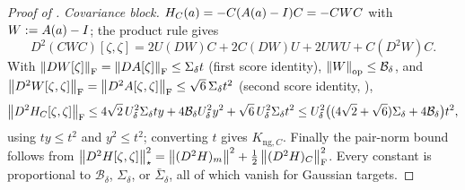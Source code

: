 \begin{proof}[Proof of ]
\emph{Covariance block.} $H_C(a)=-C(A(a)-I)C=-CWC$ with $W:=A(a)-I$; the product rule gives
\[
    D^2(CWC)[\zeta,\zeta]=2U(DW)C+2C(DW)U+2UWU+C(D^2W)C .
\]
With $\left\lVert DW[\zeta]\right\rVert_{\mathrm{F}}=\left\lVert DA[\zeta]\right\rVert_{\mathrm{F}}\leq\Sigma_\delta t$ (first score identity),
$\left\lVert W\right\rVert_{\mathrm{op}}\leq\mathcal B_\delta$, and $\left\lVert D^2W[\zeta,\zeta]\right\rVert_{\mathrm{F}}=\left\lVert D^2A[\zeta,\zeta]\right\rVert_{\mathrm{F}}\leq\sqrt6\,\Sigma_\delta t^2$
(second score identity, ),
\[
    \left\lVert D^2H_C[\zeta,\zeta]\right\rVert_{\mathrm{F}}
    \leq4\sqrt2\,U_\delta^2\Sigma_\delta ty+4\mathcal B_\delta U_\delta^2y^2+\sqrt6\,U_\delta^2\Sigma_\delta t^2
    \leq U_\delta^2\bigl((4\sqrt2+\sqrt6)\Sigma_\delta+4\mathcal B_\delta\bigr)t^2,
\]
using $ty\leq t^2$ and $y^2\leq t^2$; converting $t$ gives $K_{\mathrm{ng},C}$. Finally the pair-norm
bound follows from $\left\lVert D^2H[\zeta,\zeta]\right\rVert_\star^2=\left\lVert (D^2H)_m\right\rVert^2+\tfrac12\left\lVert (D^2H)_C\right\rVert_{\mathrm{F}}^2$.
Every constant is proportional to $\mathcal B_\delta$, $\Sigma_\delta$, or $\bar\Sigma_\delta$, all of
which vanish for Gaussian targets.
\end{proof}


\nocite{roeder2017sticking,lambert2022variational,chen2023sampling,amari1998natural,opper2009variational,kim2024stl,domke2023provable}




